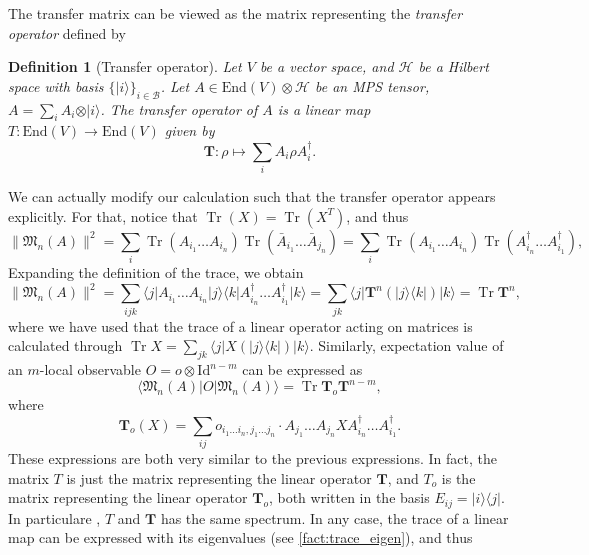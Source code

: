 \documentclass{article}
\newtheorem{definition}{Definition}
\newcommand{\tr}{\operatorname{Tr}}
\newcommand{\id}{\mathrm{Id}}
\newcommand{\End}{\mathrm{End}}
\newcommand{\ket}[1]{\vert #1 \rangle}
\newcommand{\bra}[1]{\langle #1 \vert}
\begin{document}
The transfer matrix can be viewed as the matrix representing the \emph{transfer operator} defined by
\begin{definition}[Transfer operator]
  Let $V$ be a vector space, and $\mathcal{H}$ be a Hilbert space with basis $\{\ket{i}\}_{i\in \mathcal{B}}$. Let $A\in \End(V)\otimes \mathcal{H}$ be an MPS tensor, $A = \sum_i A_i \otimes \ket{i}$. The \emph{transfer operator} of $A$ is a linear map $T: \End(V) \to \End(V)$ given by 
\begin{equation*}
  \mathbf{T}: \rho \mapsto \sum_i A_i \rho A_i^\dagger.
\end{equation*}
\end{definition}
We can actually modify our calculation such that the transfer operator appears explicitly. For that, notice that $\tr(X) = \tr(X^T)$, and thus  
\begin{equation*}
  \| \mathfrak{M}_n(A) \|^2 = \sum_{i} \tr(A_{i_1} \dots A_{i_n}) \tr (\bar{A}_{i_1} \dots \bar{A}_{j_n}) = \sum_{i} \tr(A_{i_1} \dots A_{i_n}) \tr (A^\dagger_{i_n} \dots A^\dagger_{i_1}),
\end{equation*}
Expanding the definition of the trace, we obtain
\begin{equation*}
  \| \mathfrak{M}_n(A) \|^2 = \sum_{ijk} \bra{j}A_{i_1} \dots A_{i_n}\ket{j}\bra{k} A^\dagger_{i_n} \dots A^\dagger_{i_1}\ket{k} = \sum_{jk} \bra{j} \mathbf{T}^n(\ket{j}\bra{k}) \ket{k} = \tr \mathbf{T}^n,
\end{equation*}
where we have used that the trace of a linear operator acting on matrices is calculated through $\tr X = \sum_{jk} \bra{j} X(\ket{j}\bra{k}) \ket{k}$. Similarly, expectation value of an $m$-local observable $O = o \otimes \id^{n-m}$ can be expressed as 
\begin{equation*}
  \bra{\mathfrak{M}_n(A)} O \ket{\mathfrak{M}_n(A)} =  \tr \mathbf{T}_o \mathbf{T}^{n-m},
\end{equation*}
where 
\begin{equation*}
  \mathbf{T}_o(X) = \sum_{ij} o_{i_1 \dots i_n, j_1 \dots j_n} \cdot A_{j_1} \dots A_{j_n} X A_{i_n}^\dagger \dots A_{i_1}^\dagger. 
\end{equation*}
These expressions are both very similar to the previous expressions. In fact, the matrix $T$ is just the matrix representing the linear operator $\mathbf{T}$, and $T_o$ is the matrix representing the linear operator $\mathbf{T}_o$, both written in the basis $E_{ij} = \ket{i}\bra{j}$. In particulare , $T$ and $\mathbf{T}$ has the same spectrum.  In any case, the trace of a linear map can be expressed with its eigenvalues (see \cref{fact:trace_eigen}), and thus 
\end{document}
